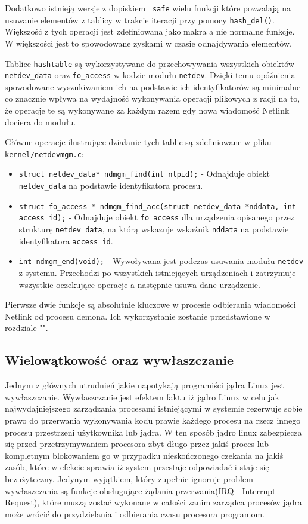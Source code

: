 \documentclass[10pt]{scrartcl}
\begin{document}
Dodatkowo istnieją wersje z dopiskiem \texttt{\_safe} wielu funkcji które pozwalają na usuwanie elementów z tablicy w trakcie iteracji przy pomocy \texttt{hash\_del()}. Większość z tych operacji jest zdefiniowana jako makra a nie normalne funkcje. W większości jest to spowodowane zyskami w czasie odnajdywania elementów.

Tablice \texttt{hashtable} są wykorzystywane do przechowywania wszystkich obiektów \texttt{netdev\_data} oraz \texttt{fo\_access} w kodzie modułu \texttt{netdev}. Dzięki temu opóźnienia spowodowane wyszukiwaniem ich na podstawie ich identyfikatorów są minimalne co znacznie wpływa na wydajność wykonywania operacji plikowych z racji na to, że operacje te są wykonywane za każdym razem gdy nowa wiadomość Netlink dociera do modułu.

Główne operacje ilustrujące działanie tych tablic są zdefiniowane w pliku \texttt{kernel/netdevmgm.c}:

\begin{itemize}
\itemsep1pt\parskip0pt
\item
  \texttt{struct netdev\_data* ndmgm\_find(int nlpid);} - Odnajduje obiekt \texttt{netdev\_data} na podstawie identyfikatora procesu.
\item
  \texttt{struct fo\_access * ndmgm\_find\_acc(struct netdev\_data *nddata, int access\_id);} - Odnajduje obiekt \texttt{fo\_access} dla urządzenia opisanego przez strukturę \texttt{netdev\_data}, na którą wskazuje wskaźnik \texttt{nddata} na podstawie identyfikatora \texttt{access\_id}.
\item
  \texttt{int ndmgm\_end(void);} - Wywoływana jest podczas usuwania modułu \texttt{netdev} z systemu. Przechodzi po wszystkich istniejących urządzeniach i zatrzymuje wszystkie oczekujące operacje a następnie usuwa dane urządzenie.
\end{itemize}

Pierwsze dwie funkcje są absolutnie kluczowe w procesie odbierania wiadomości Netlink od procesu demona. Ich wykorzystanie zostanie przedstawione w rozdziale "".

\subsection{Wielowątkowość oraz wywłaszczanie}

Jednym z głównych utrudnień jakie napotykają programiści jądra Linux jest wywłaszczanie. Wywłaszczanie jest efektem faktu iż jądro Linux w celu jak najwydajniejszego zarządzania procesami istniejącymi w systemie rezerwuje sobie prawo do przerwania wykonywania kodu prawie każdego procesu na rzecz innego procesu przestrzeni użytkownika lub jądra. W ten sposób jądro linux zabezpiecza się przed przetrzymywaniem procesora zbyt długo przez jakiś proces lub kompletnym blokowaniem go w przypadku nieskończonego czekania na jakiś zasób, które w efekcie sprawia iż system przestaje odpowiadać i staje się bezużyteczny. Jedynym wyjątkiem, który zupełnie ignoruje problem wywłaszczania są funkcje obsługujące żądania przerwania(IRQ - Interrupt Request), które muszą zostać wykonane w całości zanim zarządca procesów jądra może wrócić do przydzielania i odbierania czasu procesora programom.
\end{document}
